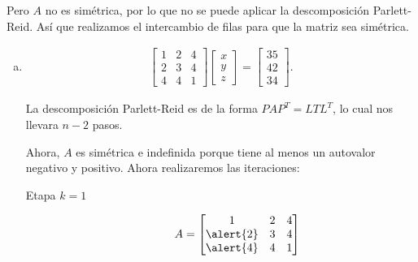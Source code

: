 \begin{frame}
\begin{solution}
\begin{enumerate}[a)]
		\end{enumerate}
		Pero \alert{$A$ no es simétrica}, por lo que no se puede aplicar
		la descomposición Parlett-Reid.
		Así que realizamos el intercambio de filas para que la matriz sea
		simétrica.
	\end{solution}
\end{frame}

\begin{frame}
	\begin{solution}
		\begin{enumerate}[b)]
			\item

			      \begin{align*}
				      \begin{bmatrix}
					      1 & 2 & 4 \\
					      2 & 3 & 4 \\
					      4 & 4 & 1
				      \end{bmatrix}
				      \begin{bmatrix}
					      x \\
					      y \\
					      z
				      \end{bmatrix} =
				      \begin{bmatrix}
					      35 \\
					      42 \\
					      34
				      \end{bmatrix}.
			      \end{align*}

			      La descomposición Parlett-Reid es de la forma
			      $PAP^{T}=LTL^{T}$, lo cual nos llevara $n-2$ pasos.

			      Ahora, $A$ es simétrica e indefinida porque tiene al menos un autovalor
			      negativo y positivo.
			      Ahora realizaremos las iteraciones:
			      \begin{description}
				      \item[Etapa $k=1$]

					      \begin{equation*}
						      A =
						      \begin{bmatrix}
							      1         & 2 & 4 \\
							      \alert{2} & 3 & 4 \\
							      \alert{4} & 4 & 1
						      \end{bmatrix}
					      \end{equation*}


\end{description}
\end{enumerate}
\end{solution}
\end{frame}
